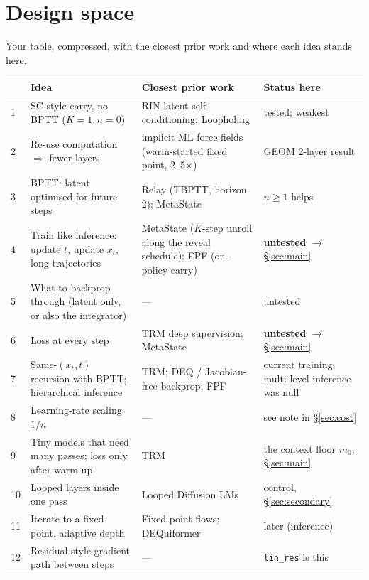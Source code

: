 \documentclass[11pt,a4paper]{article}
\newcommand{\code}[1]{\texttt{#1}}
\begin{document}
\section{Design space}\label{sec:space}

Your table, compressed, with the closest prior work and where each idea stands here.

\begin{center}\small
\begin{tabularx}{\textwidth}{@{}l Y Y Y@{}}
\toprule
 & Idea & Closest prior work & Status here \\
 & SC-style carry, no BPTT ($K{=}1,n{=}0$) & RIN latent self-conditioning; Loopholing & tested; weakest \\
2 & Re-use computation $\Rightarrow$ fewer layers & implicit ML force fields (warm-started fixed point, 2--5$\times$) & GEOM 2-layer result \\
3 & BPTT: latent optimised for future steps & Relay (TBPTT, horizon 2); MetaState & $n{\ge}1$ helps \\
4 & Train like inference: update $t$, update $x_t$, long trajectories & MetaState ($K$-step unroll along the reveal schedule); FPF (on-policy carry) & \textbf{untested} $\rightarrow$ \S\ref{sec:main} \\
5 & What to backprop through (latent only, or also the integrator) & --- & untested \\
6 & Loss at every step & TRM deep supervision; MetaState & \textbf{untested} $\rightarrow$ \S\ref{sec:main} \\
7 & Same-$(x_t,t)$ recursion with BPTT; hierarchical inference & TRM; DEQ / Jacobian-free backprop; FPF & current training; multi-level inference was null \\
8 & Learning-rate scaling $1/n$ & --- & see note in \S\ref{sec:cost} \\
9 & Tiny models that need many passes; loss only after warm-up & TRM & the context floor $m_0$, \S\ref{sec:main} \\
10 & Looped layers inside one pass & Looped Diffusion LMs & control, \S\ref{sec:secondary} \\
11 & Iterate to a fixed point, adaptive depth & Fixed-point flows; DEQuiformer & later (inference) \\
12 & Residual-style gradient path between steps & --- & \code{lin\_res} is this \\
\bottomrule
\end{tabularx}
\end{center}
\end{document}
